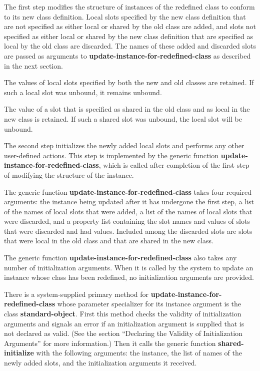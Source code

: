 
The first step modifies the structure of instances of the redefined
class to conform to its new class definition.  Local slots specified
by the new class definition that are not specified as either local or
shared by the old class are added, and slots not specified as either
local or shared by the new class definition that are specified as
local by the old class are discarded. The names of these added and discarded
slots are passed as arguments to {\bf update-instance-for-redefined-class}
as described in the next section.

The values of local slots specified by both the new and old classes
are retained. If such a local slot was unbound, it remains unbound.

The value of a slot that is specified as shared in the old class and
as local in the new class is retained.  If such a shared slot was
unbound, the local slot will be unbound.

\endsubSection%


The second step initializes the newly added local slots and performs
any other user-defined actions.  This step is implemented by the generic
function {\bf update-instance-for-redefined-class}, which is called after
completion of the first step of modifying the structure of the
instance.

The generic function {\bf update-instance-for-redefined-class} takes
four required arguments: the instance being updated after it has
undergone the first step, a list of the names of local slots that were
added, a list of the names of local slots that were discarded, and a
property list containing the slot names and values of slots that were
discarded and had values.  Included among the discarded slots are
slots that were local in the old class and that are shared in the new
class.

The generic function {\bf update-instance-for-redefined-class} also
takes any number of initialization arguments.  When it is called by
the system to update an instance whose class has been redefined, no
initialization arguments are provided.

There is a system-supplied primary method for {\bf
update-instance-for-redefined-class} whose parameter specializer for
its instance argument is the class {\bf standard-object}.  First this
method checks the validity of initialization arguments and signals an
error if an initialization argument is supplied that is not declared
as valid.  (See the section ``Declaring the Validity of Initialization
Arguments'' for more information.)  Then it calls the generic function
{\bf shared-initialize} with the following arguments: the instance,
the list of names of the newly added slots, and the initialization
arguments it received.

